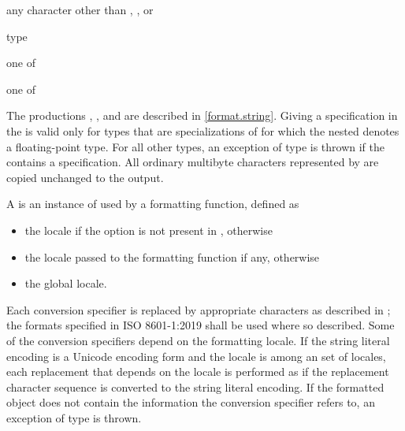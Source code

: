 \begin{ncbnf}
\br
    \textnormal{any character other than \tcode{\{}, \tcode{\}}, or \tcode{\%}}
\end{ncbnf}

\begin{ncbnf}
\br
    \terminal{\%}  type
\end{ncbnf}

\begin{ncbnf}
 \textnormal{one of}\br
\end{ncbnf}

\begin{ncbnf}
 \textnormal{one of}\br
    \br
\end{ncbnf}

The productions
,
, and
are described in \ref{format.string}.
Giving a  specification
in the 
is valid only for types that are
specializations of 
for which the nested   denotes
a floating-point type.
For all other types,
an exception of type  is thrown
if the 
contains a  specification.
All ordinary multibyte characters
represented by 
are copied unchanged to the output.

\pnum
A  is an instance of 
used by a formatting function, defined as
\begin{itemize}
\item
the  locale if the  option
is not present in , otherwise
\item
the locale passed to the formatting function if any, otherwise
\item
the global locale.
\end{itemize}

\pnum
Each conversion specifier 
is replaced by appropriate characters
as described in ;
the formats specified in ISO 8601-1:2019 shall be used where so described.
Some of the conversion specifiers
depend on the formatting locale.
If the string literal encoding is a Unicode encoding form and
the locale is among
an  set of locales,
each replacement that depends on the locale is performed as if
the replacement character sequence is converted to the string literal encoding.
If the formatted object does not contain the information
the conversion specifier refers to,
an exception of type  is thrown.

